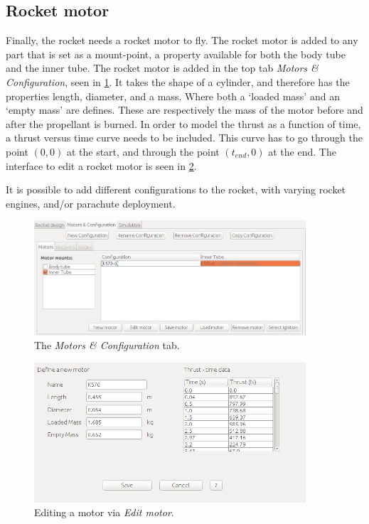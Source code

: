 \documentclass[11pt, a4paper]{article}
\begin{document}
\subsection{Rocket motor} \label{subsec:motor}

Finally, the rocket needs a rocket motor to fly. The rocket motor is added to any part that is set as a mount-point, a property available for both the body tube and the inner tube. The rocket motor is added in the top tab \emph{Motors \& Configuration}, seen in \cref{fig:motor}. It takes the shape of a cylinder, and therefore has the properties length, diameter, and a mass.
Where both a `loaded mass' and an `empty mass' are defines. These are respectively the mass of the motor before and after the propellant is burned.
In order to model the thrust as a function of time, a thrust versus time curve needs to be included. This curve has to go through the point $(0,0)$ at the start, and through the point $(t_{end},0)$ at the end. The interface to edit a rocket motor is seen in \cref{fig:motor-edit}.

It is possible to add different configurations to the rocket, with varying rocket engines, and/or parachute deployment.

\begin{figure}
  \centering
    \includegraphics[width=0.9\textwidth]{r-motor.png}
  \caption{The \emph{Motors \& Configuration} tab.}
  \label{fig:motor}
\end{figure}

\begin{figure}
  \centering
    \includegraphics[width=0.9\textwidth]{r-motor-edit.png}
  \caption{Editing a motor via \emph{Edit motor}.}
  \label{fig:motor-edit}
\end{figure}
\end{document}
